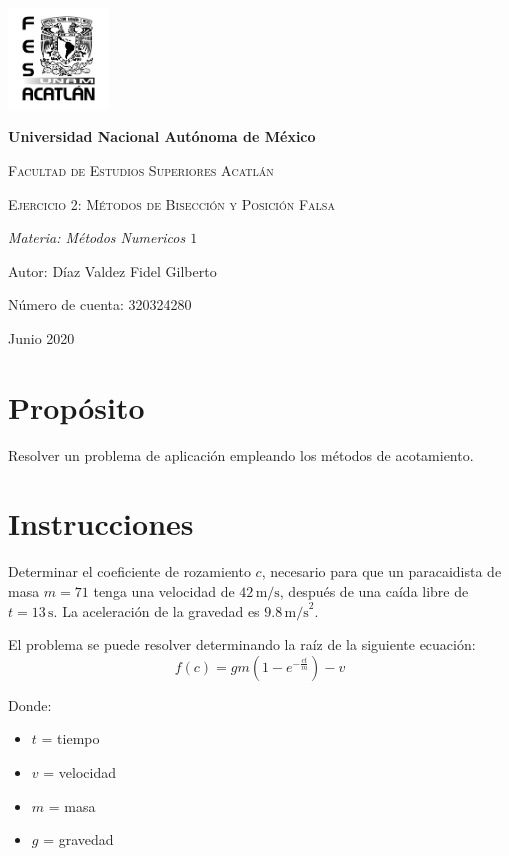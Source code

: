 \documentclass{article}
\begin{document}
    \begin{titlepage}
        
        \centering
        {\includegraphics[width=0.2\textwidth]{logo.png}\par}
        \vspace{1cm}
        {\bfseries\LARGE Universidad Nacional Autónoma de México \par}
        \vspace{1cm}
        {\scshape\Large Facultad de Estudios Superiores Acatlán \par}
        \vspace{3cm}
        {\scshape\Huge Ejercicio 2: Métodos de Bisección y Posición Falsa \par}
        \vspace{3cm}
        {\itshape\Large Materia: Métodos Numericos $1$ \par}
        \vfill
        {\Large Autor: Díaz Valdez Fidel Gilberto \par}
        {\Large Número de cuenta: 320324280 \par}
        \vfill
        {\Large Junio 2020 \par}
    \end{titlepage}


\section{Propósito}
Resolver un problema de aplicación empleando los métodos de acotamiento.

\section{Instrucciones}
Determinar el coeficiente de rozamiento \(c\), necesario para que un paracaidista de masa \(m = 71\) tenga una velocidad de \(42 \, \text{m/s}\), después de una caída libre de \(t = 13 \, \text{s}\). La aceleración de la gravedad es \(9.8 \, \text{m/s}^2\).

El problema se puede resolver determinando la raíz de la siguiente ecuación:
\[f(c) = gm\left(1 - e^{-\frac{ct}{m}}\right) - v\]

Donde:
\begin{itemize}
    \item \(t\) = tiempo
    \item \(v\) = velocidad
    \item \(m\) = masa
    \item \(g\) = gravedad
\end{itemize}
\end{document}
